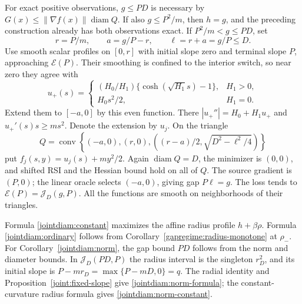 For exact positive observations, $g\le PD$ is necessary by
$G(x)\le\|\nabla f(x)\|\operatorname{diam}Q$. If also
$g\le P^2/m$, then $h=g$, and the preceding construction already
has both observations exact. If $P^2/m<g\le PD$, set
\[
 r=P/m,\qquad a=g/P-r,\qquad \ell=r+a=g/P\le D.
\]
Use smooth scalar profiles on $[0,r]$ with initial slope zero
and terminal slope $P$, approaching $\mathcal E(P)$. Their
smoothing is confined to the interior switch, so near zero
they agree with
\[
 u_+(s)=
 \begin{cases}
 (H_0/H_1)\{\cosh(\sqrt{H_1}s)-1\},&H_1>0,\\
 H_0s^2/2,&H_1=0.
 \end{cases}
\]
Extend them to $[-a,0]$ by this even function. There
$|u_+''|=H_0+H_1u_+$ and $u_+'(s)s\ge ms^2$.
Denote the extension by $u_j$.
On the triangle
\[
 Q=\operatorname{conv}\left\{(-a,0),(r,0),
       \left((r-a)/2,\sqrt{D^2-\ell^2/4}\right)\right\}
\]
put $f_j(s,y)=u_j(s)+my^2/2$. Again $\operatorname{diam}Q=D$,
the minimizer is $(0,0)$, and shifted RSI and the Hessian bound
hold on all of $Q$. The source gradient is $(P,0)$; the linear
oracle selects $(-a,0)$, giving gap $P\ell=g$. The loss tends
to $\mathcal E(P)=\mathcal J_D(g,P)$. All the functions are
smooth on neighborhoods of their triangles.

Formula \eqref{jointdiam:constant} maximizes the affine radius
profile $h+\beta\rho$. Formula \eqref{jointdiam:ordinary} follows
from Corollary~\ref{gapregime:radius-monotone} at $\rho_-$.
For Corollary~\ref{jointdiam:norm}, the gap bound $PD$ follows
from the norm and diameter bounds. In
$\mathcal J_D(PD,P)$ the radius interval is the singleton
$r_D^2$, and its initial slope is
$P-mr_D=\max\{P-mD,0\}=q$. The radial identity and
Proposition~\ref{joint:fixed-slope} give
\eqref{jointdiam:norm-formula}; the constant-curvature radius
formula gives \eqref{jointdiam:norm-constant}.
